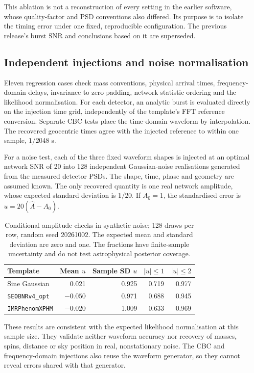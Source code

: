\documentclass[11pt,a4paper]{article}
\begin{document}
This ablation is not a reconstruction of every setting in the earlier software, whose quality-factor and PSD conventions also differed. Its purpose is to isolate the timing error under one fixed, reproducible configuration. The previous release's burst SNR and conclusions based on it are superseded.

\subsection{Independent injections and noise normalisation}
Eleven regression cases check mass conventions, physical arrival times, frequency-domain delays, invariance to zero padding, network-statistic ordering and the likelihood normalisation. For each detector, an analytic burst is evaluated directly on the injection time grid, independently of the template's FFT reference conversion. Separate CBC tests place the time-domain waveform by interpolation. The recovered geocentric times agree with the injected reference to within one sample, $1/2048$ s.

For a noise test, each of the three fixed waveform shapes is injected at an optimal network SNR of 20 into 128 independent Gaussian-noise realisations generated from the measured detector PSDs. The shape, time, phase and geometry are assumed known. The only recovered quantity is one real network amplitude, whose expected standard deviation is $1/20$. If $A_0=1$, the standardised error is $u=20(\widehat A-A_0)$.

\begin{table}[ht]
\centering\small
\begin{tabular}{lrrrr}
\toprule
Template & Mean $u$ & Sample SD $u$ & $|u|\leq1$ & $|u|\leq2$\\
\midrule
Sine Gaussian & 0.021 & 0.925 & 0.719 & 0.977\\
\texttt{SEOBNRv4\_opt} & $-0.050$ & 0.971 & 0.688 & 0.945\\
\texttt{IMRPhenomXPHM} & $-0.020$ & 1.009 & 0.633 & 0.969\\
\bottomrule
\end{tabular}
\caption{Conditional amplitude checks in synthetic noise; 128 draws per row, random seed 20261002. The expected mean and standard deviation are zero and one. The fractions have finite-sample uncertainty and do not test astrophysical posterior coverage.}
\end{table}

These results are consistent with the expected likelihood normalisation at this sample size. They validate neither waveform accuracy nor recovery of masses, spins, distance or sky position in real, nonstationary noise. The CBC and frequency-domain injections also reuse the waveform generator, so they cannot reveal errors shared with that generator.
\end{document}
